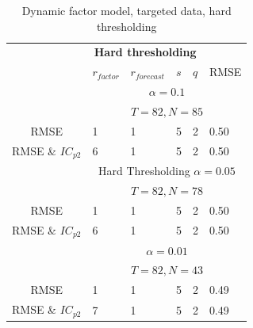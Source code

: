 \documentclass[12pt]{article}
\begin{document}
\begin{table}[ht]
	\centering
	\begin{tabular}{c|lllll}
		   & \multicolumn{4}{c}{\textbf{Hard thresholding}} \\
		   & $r_{factor}$ & $r_{forecast}$ & $s$ & $q$ & RMSE\\
		 \hline
		 \hline
		  & \multicolumn{5}{c}{$\alpha=0.1$} \\ 
		  & \multicolumn{5}{c}{$T=82, N=85$} \\
		  \hline
		   	RMSE & 1 & 1 & 5 & 2 & 0.50 \\
		   	RMSE \& $IC_{p2}$ & 6 & 1 & 5 & 2 & 0.50 \\
		 \hline
 		 \hline
		  & \multicolumn{5}{c}{Hard Thresholding $\alpha=0.05$} \\ 
 		 & \multicolumn{5}{c}{$T=82, N=78$} \\
		  \hline
		   	RMSE & 1 & 1 & 5 & 2 & 0.50 \\
		   	RMSE \& $IC_{p2}$ & 6 & 1 & 5 & 2 & 0.50 \\
		 \hline
 		 \hline
 		 & \multicolumn{5}{c}{$\alpha=0.01$} \\ 
 		 & \multicolumn{5}{c}{$T=82, N=43$} \\
		  \hline
		   	RMSE & 1 & 1 & 5 & 2 & 0.49 \\
		   	RMSE \& $IC_{p2}$ & 7 & 1 & 5 & 2 & 0.49 \\
		 \hline
 		 \hline
	\end{tabular}
	\caption{Dynamic factor model, targeted data, hard thresholding}
	\label{results dynamic factor model, targeted data sets}
\end{table}
\end{document}
